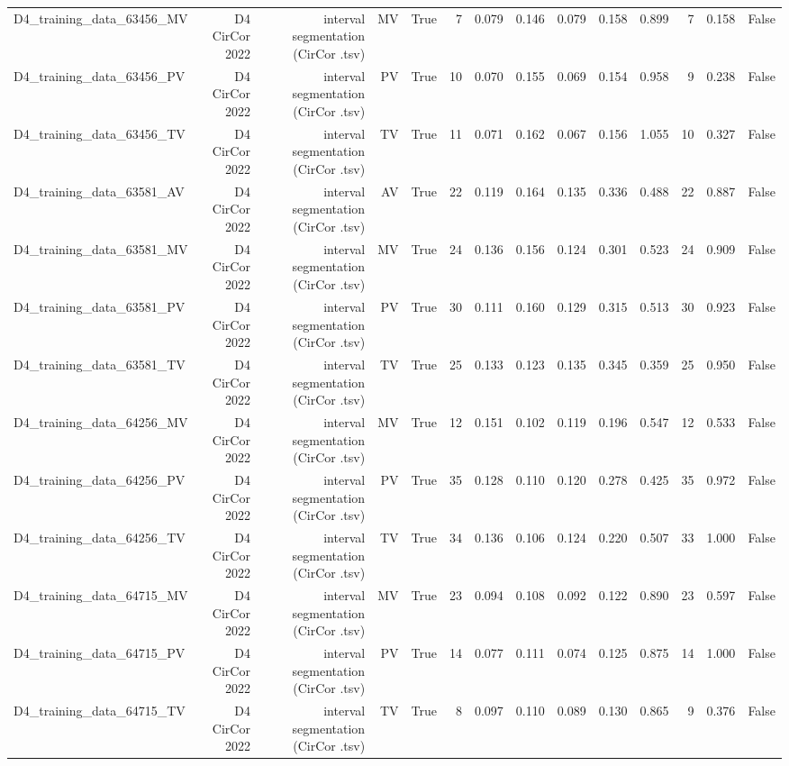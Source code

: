 \begin{table}[htbp]
\begin{tabular}{lrrrrrrrrrrrrr}
    D4\_training\_data\_63456\_MV & D4 CirCor 2022 & interval segmentation (CirCor .tsv) & MV & True & 7 & 0.079 & 0.146 & 0.079 & 0.158 & 0.899 & 7 & 0.158 & False \\
    D4\_training\_data\_63456\_PV & D4 CirCor 2022 & interval segmentation (CirCor .tsv) & PV & True & 10 & 0.070 & 0.155 & 0.069 & 0.154 & 0.958 & 9 & 0.238 & False \\
    D4\_training\_data\_63456\_TV & D4 CirCor 2022 & interval segmentation (CirCor .tsv) & TV & True & 11 & 0.071 & 0.162 & 0.067 & 0.156 & 1.055 & 10 & 0.327 & False \\
    D4\_training\_data\_63581\_AV & D4 CirCor 2022 & interval segmentation (CirCor .tsv) & AV & True & 22 & 0.119 & 0.164 & 0.135 & 0.336 & 0.488 & 22 & 0.887 & False \\
    D4\_training\_data\_63581\_MV & D4 CirCor 2022 & interval segmentation (CirCor .tsv) & MV & True & 24 & 0.136 & 0.156 & 0.124 & 0.301 & 0.523 & 24 & 0.909 & False \\
    D4\_training\_data\_63581\_PV & D4 CirCor 2022 & interval segmentation (CirCor .tsv) & PV & True & 30 & 0.111 & 0.160 & 0.129 & 0.315 & 0.513 & 30 & 0.923 & False \\
    D4\_training\_data\_63581\_TV & D4 CirCor 2022 & interval segmentation (CirCor .tsv) & TV & True & 25 & 0.133 & 0.123 & 0.135 & 0.345 & 0.359 & 25 & 0.950 & False \\
    D4\_training\_data\_64256\_MV & D4 CirCor 2022 & interval segmentation (CirCor .tsv) & MV & True & 12 & 0.151 & 0.102 & 0.119 & 0.196 & 0.547 & 12 & 0.533 & False \\
    D4\_training\_data\_64256\_PV & D4 CirCor 2022 & interval segmentation (CirCor .tsv) & PV & True & 35 & 0.128 & 0.110 & 0.120 & 0.278 & 0.425 & 35 & 0.972 & False \\
    D4\_training\_data\_64256\_TV & D4 CirCor 2022 & interval segmentation (CirCor .tsv) & TV & True & 34 & 0.136 & 0.106 & 0.124 & 0.220 & 0.507 & 33 & 1.000 & False \\
    D4\_training\_data\_64715\_MV & D4 CirCor 2022 & interval segmentation (CirCor .tsv) & MV & True & 23 & 0.094 & 0.108 & 0.092 & 0.122 & 0.890 & 23 & 0.597 & False \\
    D4\_training\_data\_64715\_PV & D4 CirCor 2022 & interval segmentation (CirCor .tsv) & PV & True & 14 & 0.077 & 0.111 & 0.074 & 0.125 & 0.875 & 14 & 1.000 & False \\
    D4\_training\_data\_64715\_TV & D4 CirCor 2022 & interval segmentation (CirCor .tsv) & TV & True & 8 & 0.097 & 0.110 & 0.089 & 0.130 & 0.865 & 9 & 0.376 & False \\

\end{tabular}
\end{table}
